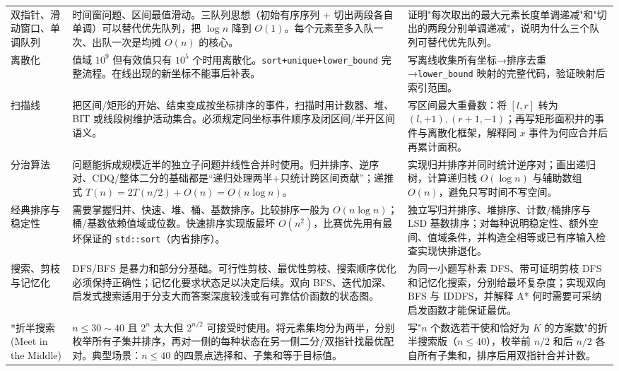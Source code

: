 \documentclass[a4paper,11pt]{article}
\newcommand{\code}[1]{\texttt{#1}}
\begin{document}
\begin{longtable}{L{2.4cm} L{7.5cm} L{6.8cm}}
双指针、滑动窗口、单调队列
& 时间窗问题、区间最值滑动。三队列思想（初始有序序列 + 切出两段各自单调）可以替代优先队列，把 $\log n$ 降到 $O(1)$。每个元素至多入队一次、出队一次是均摊 $O(n)$ 的核心。
& 证明"每次取出的最大元素长度单调递减"和"切出的两段分别单调递减"，说明为什么三个队列可替代优先队列。\\[2mm]

离散化
& 值域 $10^9$ 但有效值只有 $10^5$ 个时用离散化。\code{sort+unique+lower\_bound} 完整流程。在线出现的新坐标不能事后补表。
& 写离线收集所有坐标→排序去重→\code{lower\_bound} 映射的完整代码，验证映射后索引范围。\\[2mm]

扫描线
& 把区间/矩形的开始、结束变成按坐标排序的事件，扫描时用计数器、堆、BIT 或线段树维护活动集合。必须规定同坐标事件顺序及闭区间/半开区间语义。
& 写区间最大重叠数：将 $[l,r]$ 转为 $(l,+1),(r+1,-1)$；再写矩形面积并的事件与离散化框架，解释同 $x$ 事件为何应合并后再累计面积。\\[2mm]

分治算法
& 问题能拆成规模近半的独立子问题并线性合并时使用。归并排序、逆序对、CDQ/整体二分的基础都是“递归处理两半+只统计跨区间贡献”；递推式 $T(n)=2T(n/2)+O(n)=O(n\log n)$。
& 实现归并排序并同时统计逆序对；画出递归树，计算递归栈 $O(\log n)$ 与辅助数组 $O(n)$，避免只写时间不写空间。\\[2mm]

经典排序与稳定性
& 需要掌握归并、快速、堆、桶、基数排序。比较排序一般为 $O(n\log n)$；桶/基数依赖值域或位数。快速排序实现版最坏 $O(n^2)$，比赛优先用有最坏保证的 \code{std::sort}（内省排序）。
& 独立写归并排序、堆排序、计数/桶排序与 LSD 基数排序；对每种说明稳定性、额外空间、值域条件，并构造全相等或已有序输入检查实现快排退化。\\[2mm]

搜索、剪枝与记忆化
& DFS/BFS 是暴力和部分分基础。可行性剪枝、最优性剪枝、搜索顺序优化必须保持正确性；记忆化要求状态足以决定后续。双向 BFS、迭代加深、启发式搜索适用于分支大而答案深度较浅或有可靠估价函数的状态图。
& 为同一小题写朴素 DFS、带可证明剪枝 DFS 和记忆化搜索，分别给最坏复杂度；实现双向 BFS 与 IDDFS，并解释 A* 何时需要可采纳启发函数才能保证最优。\\[2mm]

*折半搜索 (Meet in the Middle)
& $n\le30\sim40$ 且 $2^n$ 太大但 $2^{n/2}$ 可接受时使用。将元素集均分为两半，分别枚举所有子集并排序，再对一侧的每种状态在另一侧二分/双指针找最优配对。典型场景：$n\le40$ 的四景点选择和、子集和等于目标值。
& 写"$n$ 个数选若干使和恰好为 $K$ 的方案数"的折半搜索版（$n\le40$），枚举前 $n/2$ 和后 $n/2$ 各自所有子集和，排序后用双指针合并计数。\\[2mm]


\end{longtable}
\end{document}
